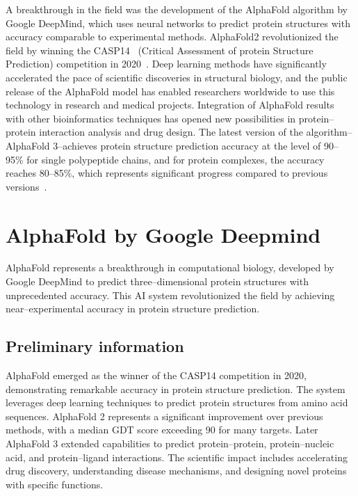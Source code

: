 A breakthrough in the field was the development of the AlphaFold algorithm by Google DeepMind, which uses neural networks to predict protein structures with accuracy comparable to experimental methods.
AlphaFold2 revolutionized the field by winning the CASP14~\cite{casp} (Critical Assessment of protein Structure Prediction) competition in 2020~\cite{alphafold2, tunyasuvunakool2021casp14}.
Deep learning methods have significantly accelerated the pace of scientific discoveries in structural biology, and the public release of the AlphaFold model has enabled researchers worldwide to use this technology in research and medical projects.
Integration of AlphaFold results with other bioinformatics techniques has opened new possibilities in protein--protein interaction analysis and drug design.
The latest version of the algorithm--AlphaFold 3--achieves protein structure prediction accuracy at the level of 90--95\% for single polypeptide chains, and for protein complexes, the accuracy reaches 80--85\%, which represents significant progress compared to previous versions~\cite{alphafold3}.


\section{AlphaFold by Google Deepmind}

AlphaFold represents a breakthrough in computational biology, developed by Google DeepMind to predict three--dimensional protein structures with unprecedented accuracy.
This AI system revolutionized the field by achieving near--experimental accuracy in protein structure prediction.

\subsection{Preliminary information}

AlphaFold emerged as the winner of the CASP14 competition in 2020, demonstrating remarkable accuracy in protein structure prediction.
The system leverages deep learning techniques to predict protein structures from amino acid sequences.
AlphaFold 2 represents a significant improvement over previous methods, with a median GDT score exceeding 90 for many targets.
Later AlphaFold 3 extended capabilities to predict protein--protein, protein--nucleic acid, and protein--ligand interactions.
The scientific impact includes accelerating drug discovery, understanding disease mechanisms, and designing novel proteins with specific functions.

